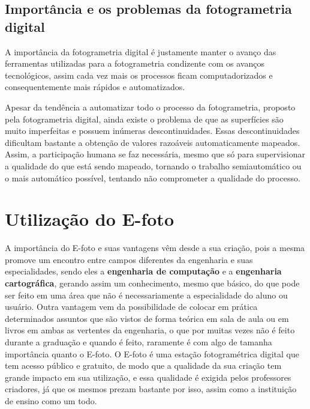 
\subsection{Importância e os problemas da fotogrametria digital}
A importância da fotogrametria digital é justamente manter o avanço das ferramentas utilizadas para a fotogrametria condizente com os avanços tecnológicos, assim cada vez mais os processos ficam computadorizados e consequentemente mais rápidos e automatizados.

Apesar da tendência a automatizar todo o processo da fotogrametria, proposto pela fotogrametria digital, ainda existe o problema de que as superfícies são muito imperfeitas e possuem inúmeras descontinuidades. Essas descontinuidades dificultam bastante a obtenção de valores razoáveis automaticamente mapeados. Assim, a participação humana se faz necessária, mesmo que só para supervisionar a qualidade do que está sendo mapeado, tornando o trabalho semiautomático ou o mais automático possível, tentando não comprometer a qualidade do processo.


\section{Utilização do E-foto}

A importância do E-foto e suas vantagens vêm desde a sua criação, pois a mesma promove um encontro entre campos diferentes da engenharia e suas especialidades, sendo eles a \textbf{engenharia de computação} e a \textbf{engenharia cartográfica}, gerando assim um conhecimento, mesmo que básico, do que pode ser feito em uma área que não é necessariamente a especialidade do aluno ou usuário. Outra vantagem vem da possibilidade de colocar em prática determinados assuntos que são vistos de forma teórica em sala de aula ou em livros em ambas as vertentes da engenharia, o que por muitas vezes não é feito durante a graduação e quando é feito, raramente é com algo de tamanha importância quanto o E-foto. O E-foto é uma estação fotogramétrica digital que tem acesso público e gratuito, de modo que a qualidade da sua criação tem grande impacto em sua utilização, e essa qualidade é exigida pelos professores criadores, já que os mesmos prezam bastante por isso, assim como a instituição de ensino como um todo.

